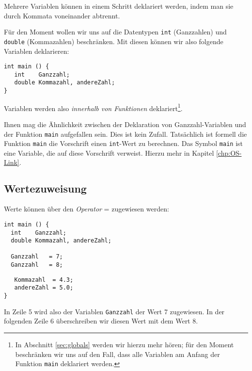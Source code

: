 Mehrere Variablen können in einem Schritt deklariert werden, indem man sie durch Kommata voneinander abtrennt.

Für den Moment wollen wir uns auf die Datentypen \texttt{int} (Ganzzahlen) und \texttt{double} (Kommazahlen) beschränken. Mit diesen können wir also folgende Variablen deklarieren:
\begin{codebox}
\begin{verbatim}
int main () {
   int    Ganzzahl;
   double Kommazahl, andereZahl;
}
\end{verbatim}
\end{codebox}
Variablen werden also \emph{innerhalb von Funktionen} deklariert\footnote{In Abschnitt \ref{sec:globals} werden wir hierzu mehr hören; für den Moment beschränken wir uns auf den Fall, dass alle Variablen am Anfang der Funktion \texttt{main} deklariert werden.}.

Ihnen mag die Ähnlichkeit zwischen der Deklaration von Ganzzahl-Variablen und der Funktion \texttt{main} aufgefallen sein. Dies ist kein Zufall. Tatsächlich ist formell die Funktion \texttt{main} die Vorschrift einen \texttt{int}-Wert zu berechnen. Das Symbol \texttt{main} ist eine Variable, die auf diese Vorschrift verweist. Hierzu mehr in Kapitel \ref{chp:OS-Link}.

\subsection{Wertezuweisung} \label{sec:valueAssignment}
Werte können über den \emph{Operator} = zugewiesen werden:
\begin{codebox}
\begin{verbatim}
int main () {
  int    Ganzzahl;
  double Kommazahl, andereZahl;

  Ganzzahl   = 7;
  Ganzzahl   = 8;
\end{verbatim}
\end{codebox}

\begin{codebox}[]
\begin{verbatim}
   Kommazahl  = 4.3;
   andereZahl = 5.0;
}
\end{verbatim}
\end{codebox}

In Zeile 5 wird also der Variablen \texttt{Ganzzahl} der Wert 7 zugewiesen. In der folgenden Zeile 6 überschreiben wir diesen Wert mit dem Wert 8.

